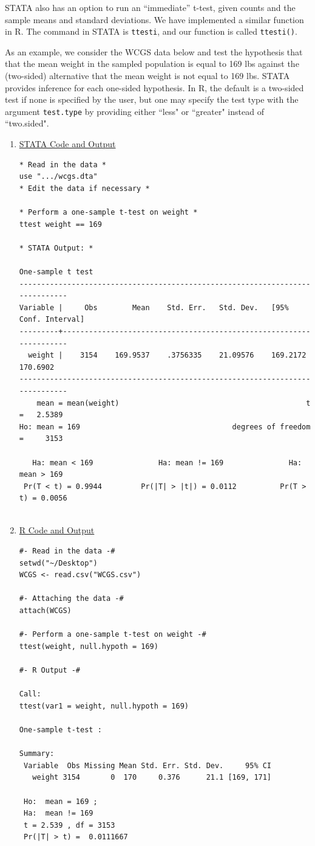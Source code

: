 \documentclass[11pt,letterpaper,fleqn]{report}
\begin{document}
STATA also has an option to run an ``immediate'' t-test, given counts and the sample means and standard deviations. We have implemented a similar function in R. The command in STATA is \texttt{ttesti}, and our function is called \texttt{ttesti()}.

As an example, we consider the WCGS data below and test the hypothesis that that the mean weight in the sampled population is equal to 169 lbs against the (two-sided) alternative that the mean weight is not equal to 169 lbs. STATA provides inference for each one-sided hypothesis. In R, the default is a two-sided test if none is specified by the user, but one may specify the test type with the argument \texttt{test.type} by providing either ``less" or ``greater" instead of ``two.sided".

\begin{enumerate}[]
\item \underline{STATA Code and Output}
{\scriptsize
\begin{verbatim}
* Read in the data *
use ".../wcgs.dta"
* Edit the data if necessary *

* Perform a one-sample t-test on weight *
ttest weight == 169

* STATA Output: *

One-sample t test
------------------------------------------------------------------------------
Variable |     Obs        Mean    Std. Err.   Std. Dev.   [95% Conf. Interval]
---------+--------------------------------------------------------------------
  weight |    3154    169.9537    .3756335    21.09576    169.2172    170.6902
------------------------------------------------------------------------------
    mean = mean(weight)                                           t =   2.5389
Ho: mean = 169                                   degrees of freedom =     3153

   Ha: mean < 169               Ha: mean != 169               Ha: mean > 169
 Pr(T < t) = 0.9944         Pr(|T| > |t|) = 0.0112          Pr(T > t) = 0.0056


\end{verbatim}}
\item \underline{R Code and Output}
{\scriptsize
\begin{verbatim}
#- Read in the data -#
setwd("~/Desktop")
WCGS <- read.csv("WCGS.csv")

#- Attaching the data -#
attach(WCGS)

#- Perform a one-sample t-test on weight -#
ttest(weight, null.hypoth = 169)

#- R Output -#

Call:
ttest(var1 = weight, null.hypoth = 169)

One-sample t-test :
 
Summary:
 Variable  Obs Missing Mean Std. Err. Std. Dev.     95% CI
   weight 3154       0  170     0.376      21.1 [169, 171]

 Ho:  mean = 169 ; 
 Ha:  mean != 169 
 t = 2.539 , df = 3153 
 Pr(|T| > t) =  0.0111667 

\end{verbatim}}
\end{enumerate}
\end{document}
